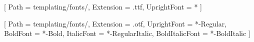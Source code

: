 \usepackage{fontspec}
\usepackage{titlesec}


\setmainfont{Arnhem_Blond}[
    Path = templating/fonts/,
    Extension = .ttf,
    UprightFont = *
]

[
    Path = templating/fonts/,
    Extension = .otf,
    UprightFont = *-Regular,
    BoldFont = *-Bold,
    ItalicFont = *-RegularItalic,
    BoldItalicFont = *-BoldItalic
]
